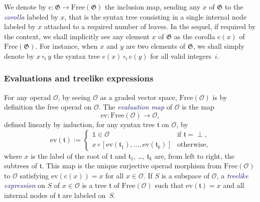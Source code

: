 \documentclass[10pt,reqno]{amsart}
\numberwithin{equation}{subsection}
\newcommand{\Oca}{\mathcal{O}}
\newcommand{\Tfr}{\mathfrak{t}}
\newcommand{\Unit}{\mathds{1}}
\newcommand{\Leaf}{\perp}
\newcommand{\Free}{\mathrm{Free}}
\newcommand{\Gen}{\mathfrak{G}}
\newcommand{\Eval}{\mathrm{ev}}
\newcommand{\Corolla}{\mathrm{c}}
\newcommand{\Def}[1]{\textcolor{MidnightBlue}{\em #1}}
\begin{document}
We denote by $\Corolla : \Gen \to \Free(\Gen)$ the inclusion map,
sending any $x$ of $\Gen$ to the \Def{corolla} labeled by $x$, that
is the syntax tree consisting in a single internal node labeled by $x$
attached to a required number of leaves. In the sequel, if required by
the context, we shall implicitly see any element $x$ of $\Gen$ as the
corolla $\Corolla(x)$ of $\Free(\Gen)$. For instance, when $x$ and $y$
are two elements of $\Gen$, we shall simply denote by $x \circ_i y$ the
syntax tree $\Corolla(x) \circ_i \Corolla(y)$ for all valid integers~$i$.
\medskip

\subsubsection{Evaluations and treelike expressions}
For any operad $\Oca$, by seeing $\Oca$ as a graded vector space,
$\Free(\Oca)$ is by definition the free operad on $\Oca$. The
\Def{evaluation map} of $\Oca$ is the map
\begin{equation}
    \Eval : \Free(\Oca) \to \Oca,
\end{equation}
defined linearly by induction, for any syntax tree $\Tfr$ on $\Oca$, by
\begin{equation}
    \Eval(\Tfr) :=
    \begin{cases}
        \Unit \in \Oca
            & \mbox{if } \Tfr = \Leaf, \\
        x \circ \left[\Eval\left(\Tfr_1\right), \dots,
        \Eval\left(\Tfr_k\right)\right]
            & \mbox{otherwise},
    \end{cases}
\end{equation}
where $x$ is the label of the root of $\Tfr$ and $\Tfr_1$, \dots,
$\Tfr_k$ are, from left to right, the subtrees of $\Tfr$. This map is
the unique surjective operad morphism from $\Free(\Oca)$ to $\Oca$
satisfying $\Eval(\Corolla(x)) = x$ for all $x \in \Oca$. If $S$ is a
subspace of $\Oca$, a \Def{treelike expression} on $S$ of $x \in \Oca$
is a tree $\Tfr$ of $\Free(\Oca)$ such that $\Eval(\Tfr) = x$ and all
internal nodes of $\Tfr$ are labeled on~$S$.
\medskip

\end{document}
